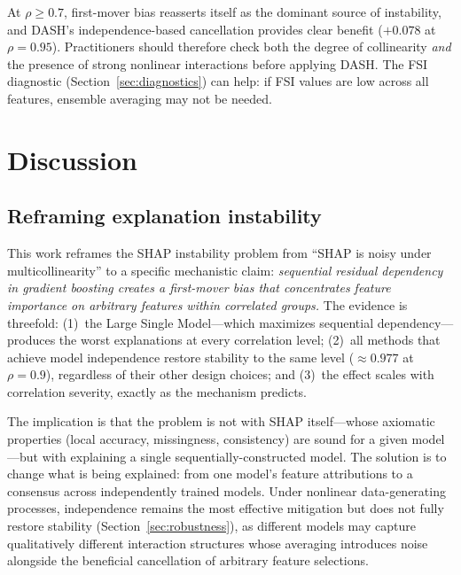 \documentclass[11pt]{article}
\newcommand{\dash}{\textsc{DASH}}
\newcommand{\rhovar}{\rho}
\begin{document}
At $\rhovar \geq 0.7$, first-mover bias reasserts itself as the dominant
source of instability, and \dash{}'s independence-based cancellation
provides clear benefit ($+0.078$ at $\rhovar = 0.95$).
Practitioners should therefore check both the degree of collinearity
\emph{and} the presence of strong nonlinear interactions before applying
\dash{}. The FSI diagnostic (Section~\ref{sec:diagnostics}) can help:
if FSI values are low across all features, ensemble averaging may not be
needed.


\section{Discussion}
\label{sec:discussion}

\subsection{Reframing explanation instability}

This work reframes the SHAP instability problem from ``SHAP is noisy
under multicollinearity'' to a specific mechanistic claim:
\emph{sequential residual dependency in gradient boosting creates a
first-mover bias that concentrates feature importance on arbitrary
features within correlated groups.} The evidence is threefold:
(1)~the Large Single Model---which maximizes sequential dependency---produces
the worst explanations at every correlation level;
(2)~all methods that achieve model independence restore stability to the
same level ($\approx 0.977$ at $\rhovar = 0.9$), regardless of their other
design choices; and
(3)~the effect scales with correlation severity, exactly as the mechanism
predicts.

The implication is that the problem is not with SHAP itself---whose
axiomatic properties (local accuracy, missingness, consistency) are
sound for a given model---but with explaining a single
sequentially-constructed model. The solution is to change what is
being explained: from one model's feature attributions to a consensus
across independently trained models. Under nonlinear data-generating
processes, independence remains the most effective mitigation but does
not fully restore stability (Section~\ref{sec:robustness}), as different
models may capture qualitatively different interaction structures whose
averaging introduces noise alongside the beneficial cancellation of
arbitrary feature selections.
\end{document}
